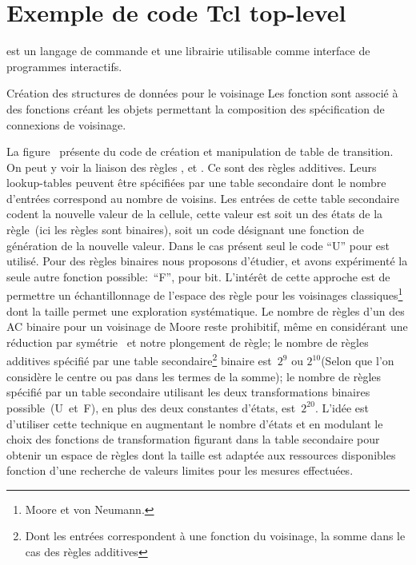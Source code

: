\chapter{Exemple de code Tcl top-level}

 est un langage de commande et une librairie
utilisable comme interface de programmes interactifs.

%
{}%
{Création des structures de données pour le voisinage}%
{Les fonction  sont associé à des fonctions 
  créant les objets permettant la composition des spécification de
  connexions de voisinage.}

La figure~ présente du code  de
création et manipulation de table de transition. %
On peut y voir la liaison des règles ,  et
. %
%
Ce sont des règles additives. %
Leurs lookup-tables peuvent être spécifiées par une table secondaire
dont le nombre d'entrées correspond au nombre de voisins. %
Les entrées de cette table secondaire codent la nouvelle valeur de la
cellule, cette valeur est soit un des états de la règle~(ici les
règles sont binaires), soit un code désignant une fonction de
génération de la nouvelle valeur. Dans le cas présent seul le code
``U'' pour  est utilisé. %
Pour des règles binaires nous proposons d'étudier, et avons
expérimenté la seule autre fonction possible:~``F'', pour
 bit. L'intérêt de cette approche est de permettre un
échantillonnage de l'espace des règle pour les voisinages
classiques\footnote{%
  Moore et von Neumann.}
dont la taille permet une exploration systématique. %
Le nombre de règles d'un des AC binaire pour un voisinage de Moore
reste prohibitif, même en considérant une réduction par
symétrie~\cite[]{Wolfram83} et notre plongement de règle; %
le nombre de règles additives spécifié par une table
secondaire\footnote{%
  Dont les entrées correspondent à une fonction du voisinage, la somme
  dans le cas des règles additives} %
binaire est~$2^9$ ou $2^{10}$(Selon que l'on considère le centre ou pas
dans les termes de la somme); %
le nombre de règles spécifié par un table secondaire utilisant les
deux transformations binaires possible~(U~et~F), en plus des deux
constantes d'états, est~$2^{20}$. L'idée est d'utiliser cette
technique en augmentant le nombre d'états et en modulant le choix des
fonctions de transformation figurant dans la table secondaire pour
obtenir un espace de règles dont la taille est adaptée aux ressources
disponibles fonction d'une recherche de valeurs limites pour les
mesures effectuées.

